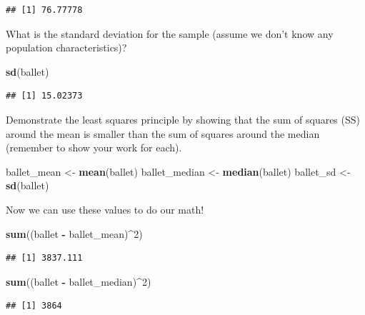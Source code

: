 \documentclass[]{book}
\newenvironment{Shaded}{\begin{snugshade}}{\end{snugshade}}
\newcommand{\KeywordTok}[1]{\textcolor[rgb]{0.13,0.29,0.53}{\textbf{#1}}}
\newcommand{\DecValTok}[1]{\textcolor[rgb]{0.00,0.00,0.81}{#1}}
\newcommand{\StringTok}[1]{\textcolor[rgb]{0.31,0.60,0.02}{#1}}
\newcommand{\OperatorTok}[1]{\textcolor[rgb]{0.81,0.36,0.00}{\textbf{#1}}}
\newcommand{\NormalTok}[1]{#1}
\theoremstyle{definition}
\theoremstyle{definition}
\theoremstyle{definition}
\theoremstyle{remark}
\begin{document}
\begin{verbatim}
## [1] 76.77778
\end{verbatim}

What is the standard deviation for the sample (assume we don't know any
population characteristics)?

\begin{Shaded}
\begin{Highlighting}[]
\KeywordTok{sd}\NormalTok{(ballet)}
\end{Highlighting}
\end{Shaded}

\begin{verbatim}
## [1] 15.02373
\end{verbatim}

Demonstrate the least squares principle by showing that the sum of
squares (SS) around the mean is smaller than the sum of squares around
the median (remember to show your work for each).

\begin{Shaded}
\begin{Highlighting}[]
\NormalTok{ballet_mean <-}\StringTok{ }\KeywordTok{mean}\NormalTok{(ballet)}
\NormalTok{ballet_median <-}\StringTok{ }\KeywordTok{median}\NormalTok{(ballet)}
\NormalTok{ballet_sd <-}\StringTok{ }\KeywordTok{sd}\NormalTok{(ballet)}
\end{Highlighting}
\end{Shaded}

Now we can use these values to do our math!

\begin{Shaded}
\begin{Highlighting}[]
\KeywordTok{sum}\NormalTok{((ballet }\OperatorTok{-}\StringTok{ }\NormalTok{ballet_mean)}\OperatorTok{^}\DecValTok{2}\NormalTok{)}
\end{Highlighting}
\end{Shaded}

\begin{verbatim}
## [1] 3837.111
\end{verbatim}

\begin{Shaded}
\begin{Highlighting}[]
\KeywordTok{sum}\NormalTok{((ballet }\OperatorTok{-}\StringTok{ }\NormalTok{ballet_median)}\OperatorTok{^}\DecValTok{2}\NormalTok{)}
\end{Highlighting}
\end{Shaded}

\begin{verbatim}
## [1] 3864
\end{verbatim}
\end{document}
